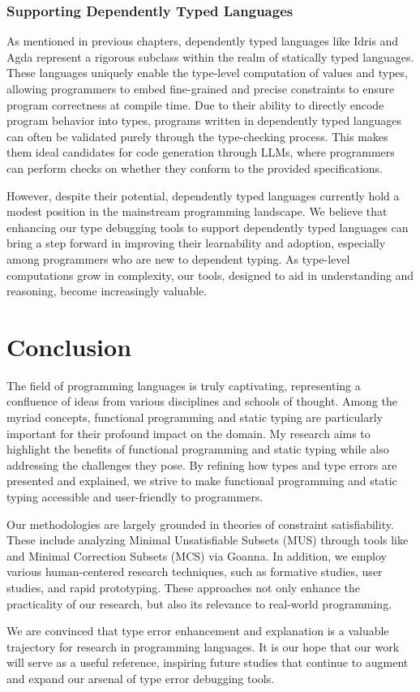 \subsubsection*{Supporting Dependently Typed Languages}

As mentioned in previous chapters, dependently typed languages like Idris and Agda represent a rigorous subclass within the realm of statically typed languages. These languages uniquely enable the type-level computation of values and types, allowing programmers to embed fine-grained and precise constraints to ensure program correctness at compile time. Due to their ability to directly encode program behavior into types, programs written in dependently typed languages can often be validated purely through the type-checking process. This makes them ideal candidates for code generation through LLMs, where programmers can perform checks on whether they conform to the provided specifications. 

However, despite their potential, dependently typed languages currently hold a modest position in the mainstream programming landscape. We believe that enhancing our type debugging tools to support dependently typed languages can bring a step forward in improving their learnability and adoption, especially among programmers who are new to dependent typing. As type-level computations grow in complexity, our tools, designed to aid in understanding and reasoning, become increasingly valuable. 


\section{Conclusion}


The field of programming languages is truly captivating, representing a confluence of ideas from various disciplines and schools of thought. Among the myriad concepts, functional programming and static typing are particularly important for their profound impact on the domain. My research aims to highlight the benefits of functional programming and static typing while also addressing the challenges they pose. By refining how types and type errors are presented and explained, we strive to make functional programming and static typing accessible and user-friendly to programmers.

Our methodologies are largely grounded in theories of constraint satisfiability. These include analyzing Minimal Unsatisfiable Subsets (MUS) through tools like \chameleon{} and Minimal Correction Subsets (MCS) via Goanna. In addition, we employ various human-centered research techniques, such as formative studies, user studies, and rapid prototyping. These approaches not only enhance the practicality of our research, but also its relevance to real-world programming.

We are convinced that type error enhancement and explanation is a valuable trajectory for research in programming languages. It is our hope that our work will serve as a useful reference, inspiring future studies that continue to augment and expand our arsenal of type error debugging tools.


